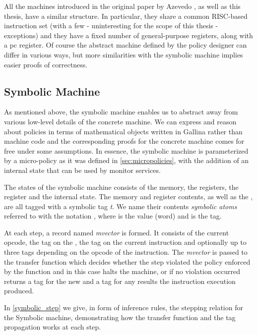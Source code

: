 All the machines introduced in the original paper by Azevedo \ETAL
\cite{popl2015}, as well as this thesis, have a similar
structure. In particular, they share a common RISC-based instruction
set (with a few - uninteresting for the scope of this thesis -
exceptions) and they have a fixed number of general-purpose registers,
along with a pc register. Of course the abstract machine defined by
the policy designer can differ in various ways, but more similarities
with the symbolic machine implies easier proofs of correctness.



\subsection{Symbolic Machine}\label{sec:symbolic}

As mentioned above, the symbolic machine enables us to abstract away from
various low-level details of the concrete machine. We can express and reason
about policies in terms of mathematical objects written in Gallina rather than
machine code and the corresponding proofs for the concrete machine comes for
free under some assumptions.
In essence, the symbolic machine is parameterized by a micro-policy as it was
defined in \ref{sec:micropolicies}, with the addition of an internal state
that can be used by monitor services.

The states of the symbolic machine consists of the memory, the
registers, the \pc register and the internal state. The memory and
register contents, as well as the \pc, are all tagged with a symbolic
tag \textit{t}. We name their contents \textit{symbolic atoms}
referred to with the notation , where  is
the value (word) and  is the tag.

At each step, a record named \emph{mvector} is formed. It consists of
the current opcode, the tag on the \pc, the tag on the current
instruction and optionally up to three tags depending on the opcode of
the instruction. The \emph{mvector} is passed to the transfer
function which decides whether the step violated the policy enforced
by the \TRANSFER function and in this case halts the machine, or if no
violation occurred returns a tag for the new \pc and a tag for any
results the instruction execution produced.

In \cref{symbolic_step} we give, in form of inference rules, the
stepping relation for the Symbolic machine, demonstrating how the
transfer function and the tag propagation works at each step.

